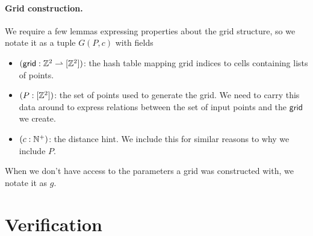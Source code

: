 \documentclass{article}
\begin{document}
\paragraph{Grid construction.}
We require a few lemmas expressing properties about the grid structure, so we notate it as a tuple $G(P, c)$ with fields
\begin{itemize}
  \item $(\mathsf{grid} : \mathbb{Z}^2 \rightharpoonup [\mathbb{Z}^2])$: the hash table mapping grid indices to cells containing lists of points.
  \item $(P : [\mathbb{Z}^2])$: the set of points used to generate the grid.
  We need to carry this data around to express relations between the set of input points and the $\mathsf{grid}$ we create.
  \item $(c : \mathbb{N}^+)$: the distance hint.
  We include this for similar reasons to why we include $P$.
\end{itemize}
When we don't have access to the parameters a grid was constructed with, we notate it as $g$.




\section{Verification}
\end{document}
